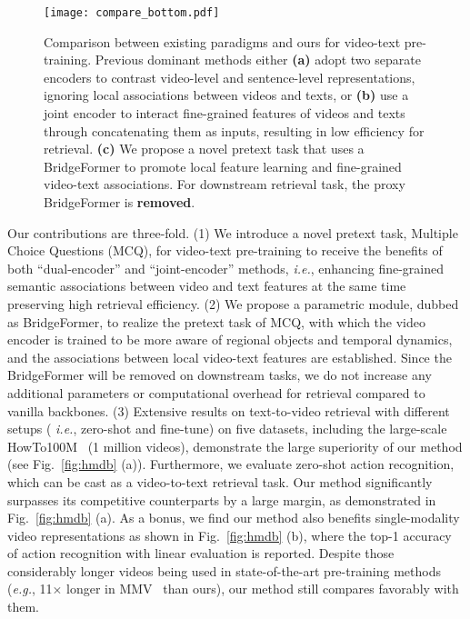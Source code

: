 \documentclass[10pt,twocolumn,letterpaper]{article}
\begin{document}
\begin{figure}
	\centering
	\texttt{[image: compare\_bottom.pdf]}
	\caption{Comparison between existing paradigms and ours for video-text pre-training. Previous dominant methods 
		either \textbf{(a)} adopt two separate encoders to contrast video-level and sentence-level representations, ignoring local associations between videos and texts, or \textbf{(b)} use a joint encoder to interact fine-grained features of videos and texts through concatenating them as inputs, resulting in low efficiency for retrieval. \textbf{(c)} We propose a novel pretext task that uses a BridgeFormer to promote local feature learning and fine-grained video-text associations. For downstream retrieval task, the proxy BridgeFormer is \textbf{removed}.}
	\label{fig:compare}
	\vspace{-4mm}	
\end{figure}

 
Our contributions are three-fold.
(1) We introduce a novel pretext task, Multiple Choice Questions (MCQ), for video-text pre-training to receive the benefits of both ``dual-encoder'' and ``joint-encoder'' methods, \textit{i.e.}, enhancing fine-grained semantic associations between video and text features at the same time preserving high retrieval efficiency. 
(2) We propose a parametric module, dubbed as BridgeFormer, to realize the pretext task of MCQ, with which the video encoder is trained to be more aware of regional objects and temporal dynamics, and the associations between local video-text features are established.
Since the BridgeFormer will be removed on downstream tasks, 
we do not increase any additional parameters or computational overhead for retrieval compared to vanilla backbones.
(3) Extensive results on text-to-video retrieval with different setups ( \textit{i.e.}, zero-shot and fine-tune) on five datasets, including the large-scale HowTo100M~\cite{howto100m} (1 million videos), demonstrate the large superiority of our method (see Fig.~\ref{fig:hmdb} (a)). 
Furthermore, we evaluate zero-shot action recognition, which can be cast as a video-to-text retrieval task.
Our method significantly surpasses its competitive counterparts by a large margin, as demonstrated in Fig.~\ref{fig:hmdb} (a).
As a bonus, we find our method also benefits single-modality video representations as shown in Fig.~\ref{fig:hmdb} (b), where the top-1 accuracy of action recognition with linear evaluation is reported.
Despite those considerably longer videos being used in state-of-the-art pre-training methods (\textit{e.g.}, 11$\times$ longer in MMV~\cite{MMV} than ours), our method still compares favorably with them.
\end{document}
